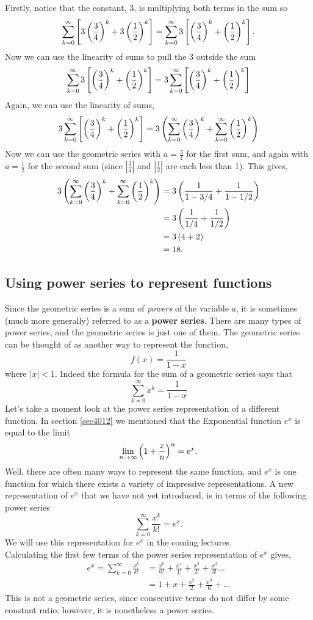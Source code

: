 \noindent Firstly, notice that the constant, $3$, is multiplying both terms in the sum so
\[
\sum_{k=0}^\infty\left[3\left(\frac{3}{4}\right)^k + 3\left(\frac{1}{2}\right)^k\right] = \sum_{k=0}^\infty3\left[\left(\frac{3}{4}\right)^k + \left(\frac{1}{2}\right)^k\right].
\]
Now we can use the linearity of sums to pull the 3 outside the sum
\[
\sum_{k=0}^\infty3\left[\left(\frac{3}{4}\right)^k + \left(\frac{1}{2}\right)^k\right] = 3\sum_{k=0}^\infty \left[\left(\frac{3}{4}\right)^k + \left(\frac{1}{2}\right)^k\right]
\]
Again, we can use the linearity of sums,
\[
3\sum_{k=0}^\infty \left[\left(\frac{3}{4}\right)^k + \left(\frac{1}{2}\right)^k\right] = 3\left(\sum_{k=0}^\infty \left(\frac{3}{4}\right)^k + \sum_{k=0}^\infty \left(\frac{1}{2}\right)^k\right)
\]
Now we can use the geometric series with $a = \frac{3}{4}$ for the first sum, and again with $a = \frac{1}{2}$ for the second sum (since $|\frac{3}{4}|$ and $|\frac{1}{2}|$ are each less than 1). This gives,
\begin{align*}
3\left(\sum_{k=0}^\infty \left(\frac{3}{4}\right)^k + \sum_{k=0}^\infty \left(\frac{1}{2}\right)^k\right) & = 3\left(\frac{1}{1-3/4} + \frac{1}{1-1/2}\right) \\
		& = 3\left(\frac{1}{1/4} + \frac{1}{1/2}\right) \\
		& = 3\left(4 + 2\right) \\
		& = 18.
\end{align*}

\subsection{Using power series to represent functions} \label{power series}
Since the geometric series is a sum of \textit{powers} of the variable $a$, it is sometimes (much more generally) referred to as a \textbf{power series}. There are many types of power series, and the geometric series is just one of them. The geometric series can be thought of as another way to represent the function,
\[
f(x) = \frac{1}{1-x}
\]
where $|x| < 1.$ Indeed the formula for the sum of a geometric series says that
\[
\sum_{k=0}^\infty x^k = \frac{1}{1-x}
\]
Let's take a moment look at the power series representation of a different function. In section \ref{sec4012} we mentioned that the Exponential function $e^x$ is equal to the limit
\[
\lim_{n \rightarrow \infty}\left(1 + \frac{x}{n}\right)^n = \mathrm{e}^x.
\]
Well, there are often many ways to represent the same function, and $e^x$ is one function for which there exists a variety of impressive representations. A new representation of $e^x$ that we have not yet introduced, is in terms of the following power series
\[
\sum_{k=0}^\infty\frac{x^k}{k!} = e^x.
\]
We will use this representation for $e^x$ in the coming lectures. \\

\noindent Calculating the first few terms of the power series representation of $e^x$ gives,
\begin{align*}
e^x = \sum_{k=0}^\infty\frac{x^k}{k!} & = \frac{x^0}{0!} + \frac{x^1}{1!} + \frac{x^2}{2!} + \frac{x^3}{3!} \ldots \\
			& = 1 + x + \frac{x^2}{2} +  \frac{x^3}{6} + \ldots
\end{align*}
This is not a geometric series, since consecutive terms do not differ by some constant ratio; however, it is nonetheless a power series. 